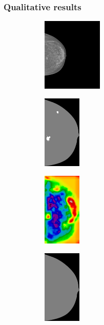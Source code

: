 \documentclass{beamer}
\begin{document}
	\begin{frame}
		\frametitle{Qualitative results}
		\begin{figure}[h]
		\centering
			\begin{subfigure}{0.25\textwidth}
				\centering
					\includegraphics[height=3.5cm]{plots/mammogram_ex1.png}
			\end{subfigure}
			\begin{subfigure}{0.16\textwidth}
				\centering
					\includegraphics[height=3.5cm]{plots/label_ex1.png}
			\end{subfigure}
			\begin{subfigure}{0.16\textwidth}
				\centering
					\includegraphics[height=3.5cm]{plots/logits_ex1_v1.png}
			\end{subfigure}
			\begin{subfigure}{0.22\textwidth}
				\centering
					\includegraphics[height=3.5cm]{plots/segmentation_ex1_v1.png}
			\end{subfigure}%
			\\
			\begin{subfigure}{0.25\textwidth}

\end{subfigure}
\end{figure}
\end{frame}
\end{document}
